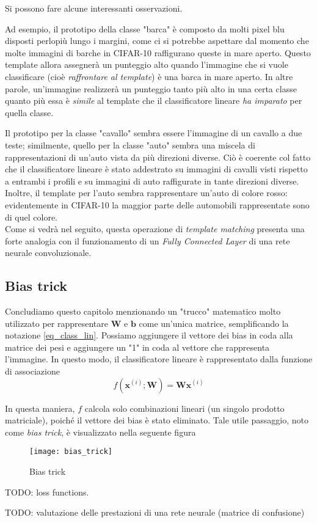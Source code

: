 Si possono fare alcune interessanti osservazioni.

Ad esempio, il prototipo della classe "barca" è composto da molti pixel blu disposti perlopiù lungo i margini, come ci si potrebbe aspettare dal momento che molte immagini di barche in CIFAR-10 raffigurano queste in mare aperto. Questo template allora assegnerà un punteggio alto quando l'immagine che si vuole classificare (cioè \textit{raffrontare al template}) è una barca in mare aperto. In altre parole, un'immagine realizzerà un punteggio tanto più alto in una certa classe quanto più essa è \textit{simile} al template che il classificatore lineare \textit{ha imparato} per quella classe.

Il prototipo per la classe "cavallo" sembra essere l'immagine di un cavallo a due teste; similmente, quello per la classe "auto" sembra una miscela di rappresentazioni di un'auto vista da più direzioni diverse. Ciò è coerente col fatto che il classificatore lineare è stato addestrato su immagini di cavalli visti rispetto a entrambi i profili e su immagini
di auto raffigurate in tante direzioni diverse. Inoltre, il template per l'auto sembra rappresentare un'auto di colore rosso: evidentemente in CIFAR-10 la maggior parte delle automobili rappresentate sono di quel colore.\\

Come si vedrà nel seguito, questa operazione di \textit{template matching} presenta una forte analogia con il funzionamento di un \textit{Fully Connected Layer} di una rete neurale convoluzionale.

\subsection*{Bias trick}
Concludiamo questo capitolo menzionando un "trucco" matematico molto utilizzato per rappresentare $\mathbf{W}$ e $\mathbf{b}$ come un'unica matrice, semplificando la notazione \ref{eq_class_lin}.
Possiamo aggiungere il vettore dei bias in coda alla matrice dei pesi e aggiungere un "1" in coda al vettore che rappresenta l'immagine. In questo modo, il classificatore lineare è rappresentato dalla funzione di associazione
\begin{equation} \label{eq_bias_trick}
f(\mathbf{x}^{(i)};\mathbf{W})=\mathbf{W}\mathbf{x}^{(i)}
\end{equation}

In questa maniera, $f$ calcola solo combinazioni lineari (un singolo prodotto matriciale), poiché il vettore dei bias è stato eliminato.
Tale utile passaggio, noto come \textit{bias trick}, è visualizzato nella seguente figura

\begin{figure}[h]
\centering
\texttt{[image: bias\_trick]}
\caption{Bias trick}
\label{bias_trick}
\end{figure}

TODO: loss functions.

TODO: valutazione delle prestazioni di una rete neurale (matrice di confusione)



